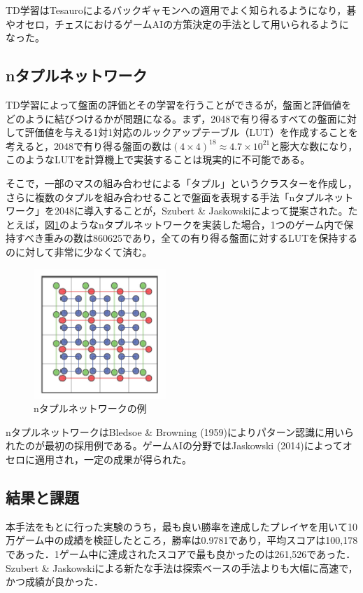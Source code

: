 \documentclass{suribt}
\begin{document}
TD学習はTesauroによるバックギャモンへの適用でよく知られるようになり，碁やオセロ，チェスにおけるゲームAIの方策決定の手法として用いられるようになった。

\subsection{nタプルネットワーク}
TD学習によって盤面の評価とその学習を行うことができるが，盤面と評価値をどのように結びつけるかが問題になる。まず，2048で有り得るすべての盤面に対して評価値を与える1対1対応のルックアップテーブル（LUT）を作成することを考えると，2048で有り得る盤面の数は$(4 \times 4)^{18} \approx 4.7 \times 10^{21}$と膨大な数になり，このようなLUTを計算機上で実装することは現実的に不可能である。

そこで，一部のマスの組み合わせによる「タプル」というクラスターを作成し，さらに複数のタプルを組み合わせることで盤面を表現する手法「nタプルネットワーク」を2048に導入することが，Szubert \& Jaskowskiによって提案された。たとえば，図\ref{figure_001}のようなnタプルネットワークを実装した場合，1つのゲーム内で保持すべき重みの数は860625であり，全ての有り得る盤面に対するLUTを保持するのに対して非常に少なくて済む。

\begin{figure}[t]
	\begin{center}
	\includegraphics[width=5cm]{figure_001.png}
	\caption{nタプルネットワークの例}
	\label{figure_001}
	\end{center}
\end{figure}

nタプルネットワークはBledsoe \& Browning (1959)によりパターン認識に用いられたのが最初の採用例である。ゲームAIの分野ではJaskowski (2014)によってオセロに適用され，一定の成果が得られた。

\subsection{結果と課題}
本手法をもとに行った実験のうち，最も良い勝率を達成したプレイヤを用いて10万ゲーム中の成績を検証したところ，勝率は0.9781であり，平均スコアは100,178であった．1ゲーム中に達成されたスコアで最も良かったのは261,526であった．Szubert \& Jaskowskiによる新たな手法は探索ベースの手法よりも大幅に高速で，かつ成績が良かった．
\end{document}
